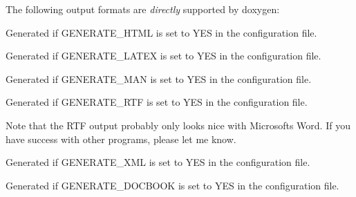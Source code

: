 
The following output formats are {\itshape directly} supported by doxygen\+: 
\begin{DoxyDescription}
\item[{\bfseries{H\+T\+ML}} ]Generated if G\+E\+N\+E\+R\+A\+T\+E\+\_\+\+H\+T\+ML is set to {\ttfamily Y\+ES} in the configuration file. 
\item[(\{\}) ]Generated if G\+E\+N\+E\+R\+A\+T\+E\+\_\+\+L\+A\+T\+EX is set to {\ttfamily Y\+ES} in the configuration file. 
\item[{\bfseries{Man pages}} ]Generated if G\+E\+N\+E\+R\+A\+T\+E\+\_\+\+M\+AN is set to {\ttfamily Y\+ES} in the configuration file. 
\item[{\bfseries{R\+TF}} ]Generated if G\+E\+N\+E\+R\+A\+T\+E\+\_\+\+R\+TF is set to {\ttfamily Y\+ES} in the configuration file.

Note that the R\+TF output probably only looks nice with Microsoft\textquotesingle{}s Word. If you have success with other programs, please let me know. 
\item[{\bfseries{X\+ML}} ]Generated if G\+E\+N\+E\+R\+A\+T\+E\+\_\+\+X\+ML is set to {\ttfamily Y\+ES} in the configuration file.


\item[{\bfseries{Doc\+Book}} ]Generated if G\+E\+N\+E\+R\+A\+T\+E\+\_\+\+D\+O\+C\+B\+O\+OK is set to {\ttfamily Y\+ES} in the configuration file.


\end{DoxyDescription}

